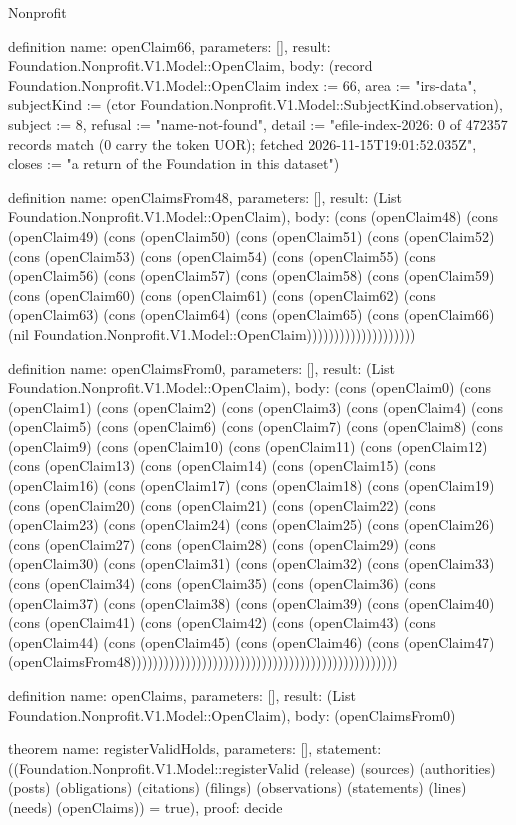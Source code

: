 \begin{lexlean}{Nonprofit}
\begin{semanticmodule}
definition{
  name: openClaim66,
  parameters: [],
  result: Foundation.Nonprofit.V1.Model::OpenClaim,
  body: (record Foundation.Nonprofit.V1.Model::OpenClaim {index := 66, area := "irs-data", subjectKind := (ctor Foundation.Nonprofit.V1.Model::SubjectKind.observation), subject := 8, refusal := "name-not-found", detail := "efile-index-2026: 0 of 472357 records match (0 carry the token UOR); fetched 2026-11-15T19:01:52.035Z", closes := "a return of the Foundation in this dataset"})
}

definition{
  name: openClaimsFrom48,
  parameters: [],
  result: (List Foundation.Nonprofit.V1.Model::OpenClaim),
  body: (cons (openClaim48) (cons (openClaim49) (cons (openClaim50) (cons (openClaim51) (cons (openClaim52) (cons (openClaim53) (cons (openClaim54) (cons (openClaim55) (cons (openClaim56) (cons (openClaim57) (cons (openClaim58) (cons (openClaim59) (cons (openClaim60) (cons (openClaim61) (cons (openClaim62) (cons (openClaim63) (cons (openClaim64) (cons (openClaim65) (cons (openClaim66) (nil Foundation.Nonprofit.V1.Model::OpenClaim))))))))))))))))))))
}

definition{
  name: openClaimsFrom0,
  parameters: [],
  result: (List Foundation.Nonprofit.V1.Model::OpenClaim),
  body: (cons (openClaim0) (cons (openClaim1) (cons (openClaim2) (cons (openClaim3) (cons (openClaim4) (cons (openClaim5) (cons (openClaim6) (cons (openClaim7) (cons (openClaim8) (cons (openClaim9) (cons (openClaim10) (cons (openClaim11) (cons (openClaim12) (cons (openClaim13) (cons (openClaim14) (cons (openClaim15) (cons (openClaim16) (cons (openClaim17) (cons (openClaim18) (cons (openClaim19) (cons (openClaim20) (cons (openClaim21) (cons (openClaim22) (cons (openClaim23) (cons (openClaim24) (cons (openClaim25) (cons (openClaim26) (cons (openClaim27) (cons (openClaim28) (cons (openClaim29) (cons (openClaim30) (cons (openClaim31) (cons (openClaim32) (cons (openClaim33) (cons (openClaim34) (cons (openClaim35) (cons (openClaim36) (cons (openClaim37) (cons (openClaim38) (cons (openClaim39) (cons (openClaim40) (cons (openClaim41) (cons (openClaim42) (cons (openClaim43) (cons (openClaim44) (cons (openClaim45) (cons (openClaim46) (cons (openClaim47) (openClaimsFrom48)))))))))))))))))))))))))))))))))))))))))))))))))
}

definition{
  name: openClaims,
  parameters: [],
  result: (List Foundation.Nonprofit.V1.Model::OpenClaim),
  body: (openClaimsFrom0)
}

theorem{
  name: registerValidHolds,
  parameters: [],
  statement: ((Foundation.Nonprofit.V1.Model::registerValid (release) (sources) (authorities) (posts) (obligations) (citations) (filings) (observations) (statements) (lines) (needs) (openClaims)) = true),
  proof: decide{}
}
\end{semanticmodule}
\end{lexlean}
